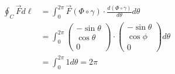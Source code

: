 \documentclass[11pt]{article}
\begin{document}
\begin{solution}
\begin{itemize}
\begin{align*}
\oint_C \vec{F} d\ell &= \int_0^{2\pi} \vec{F}(\Phi\circ \gamma)\cdot \frac{d(\Phi\circ \gamma)}{d\theta}  d \theta\\
 &= \int_0^{2\pi} \begin{pmatrix} -\sin\theta\\ \cos\theta\\ 0 \end{pmatrix}\cdot \begin{pmatrix}-\sin\theta \\ \cos\phi \\ 0\end{pmatrix} d \theta\\
&= \int_0^{2\pi} 1 d \theta = 2\pi\\
     \end{align*}   
    \end{itemize}
\end{solution}
\end{document}
